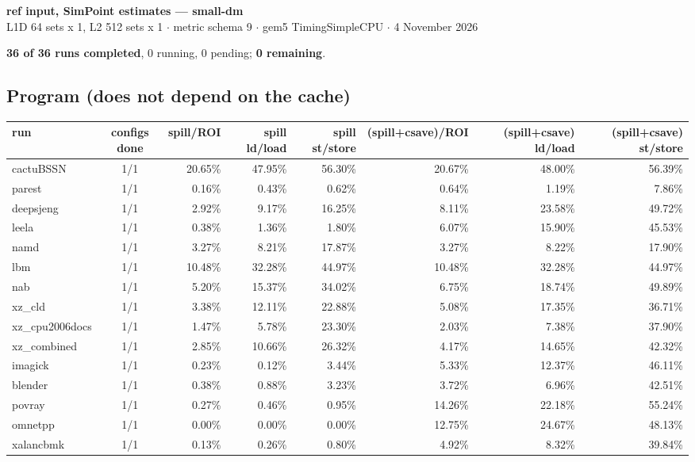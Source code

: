 \documentclass[10pt,a4paper,landscape]{article}
\begin{document}
\begin{center}
{\large\bfseries ref input, SimPoint estimates --- small-dm}\\[3pt]
{\small L1D 64 sets x 1, L2 512 sets x 1 $\cdot$ metric schema 9 $\cdot$ gem5 TimingSimpleCPU $\cdot$ 4 November 2026}
\end{center}
\textbf{36 of 36 runs completed}, 0 running, 0 pending; \textbf{0 remaining}.\par
\subsection*{Program (does not depend on the cache)}
{\footnotesize
\begin{longtable}{lcrrrrrr}
\toprule
run & configs done & spill/ROI & spill ld/load & spill st/store & (spill+csave)/ROI & (spill+csave) ld/load & (spill+csave) st/store \\
\midrule
\endhead
\bottomrule
\endfoot
cactuBSSN & 1/1 & 20.65\% & 47.95\% & 56.30\% & 20.67\% & 48.00\% & 56.39\% \\
parest & 1/1 & 0.16\% & 0.43\% & 0.62\% & 0.64\% & 1.19\% & 7.86\% \\
deepsjeng & 1/1 & 2.92\% & 9.17\% & 16.25\% & 8.11\% & 23.58\% & 49.72\% \\
leela & 1/1 & 0.38\% & 1.36\% & 1.80\% & 6.07\% & 15.90\% & 45.53\% \\
namd & 1/1 & 3.27\% & 8.21\% & 17.87\% & 3.27\% & 8.22\% & 17.90\% \\
lbm & 1/1 & 10.48\% & 32.28\% & 44.97\% & 10.48\% & 32.28\% & 44.97\% \\
nab & 1/1 & 5.20\% & 15.37\% & 34.02\% & 6.75\% & 18.74\% & 49.89\% \\
xz\_cld & 1/1 & 3.38\% & 12.11\% & 22.88\% & 5.08\% & 17.35\% & 36.71\% \\
xz\_cpu2006docs & 1/1 & 1.47\% & 5.78\% & 23.30\% & 2.03\% & 7.38\% & 37.90\% \\
xz\_combined & 1/1 & 2.85\% & 10.66\% & 26.32\% & 4.17\% & 14.65\% & 42.32\% \\
imagick & 1/1 & 0.23\% & 0.12\% & 3.44\% & 5.33\% & 12.37\% & 46.11\% \\
blender & 1/1 & 0.38\% & 0.88\% & 3.23\% & 3.72\% & 6.96\% & 42.51\% \\
povray & 1/1 & 0.27\% & 0.46\% & 0.95\% & 14.26\% & 22.18\% & 55.24\% \\
omnetpp & 1/1 & 0.00\% & 0.00\% & 0.00\% & 12.75\% & 24.67\% & 48.13\% \\
xalancbmk & 1/1 & 0.13\% & 0.26\% & 0.80\% & 4.92\% & 8.32\% & 39.84\% \\

\end{longtable}}
\end{document}
